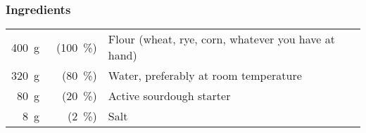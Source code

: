 \subsubsection*{Ingredients}
\begin{tabular}{r@{}rl@{}}
\qty{400}{\gram} &~(\qty{100}{\percent}) & Flour (wheat, rye, corn, whatever
                                            you have at hand)\\
\qty{320}{\gram} &  (\qty{80}{\percent}) & Water, preferably at room
                                            temperature\\
\qty{80}{\gram}  &  (\qty{20}{\percent}) & Active sourdough starter\\
\qty{8}{\gram}   &   (\qty{2}{\percent}) & Salt\\
\end{tabular}

